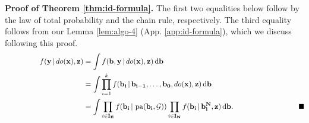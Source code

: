 \documentclass[11pt]{article}
\DeclareMathOperator{\pa}{pa}
\newcommand{\BlackBox}{\rule{1.5ex}{1.5ex}}  %
\newcommand{\mb}[1]{\mathbf{#1}}
\newcommand{\g}[1][G]{\mathcal{#1}}
\newcommand*\diff{\mathop{}\!\mathrm{d}}
\newenvironment{proofofnoqed}[1][]{\noindent \textbf{Proof of #1.}}{}
\begin{document}
\begin{proofofnoqed}[Theorem \ref{thm:id-formula}]
    The first two equalities below follow by the law of total probability and the chain rule, respectively. The third equality follows from our Lemma \ref{lem:algo-4} (App. \ref{app:id-formula}), which we discuss following this proof.
    \begingroup
    \allowdisplaybreaks
    \begin{align*}
        \hspace{.65in}
        f(\mb{y} \,|\, do(\mb{x}), \mb{z})
            &= \int f(\mb{b}, \mb{y} \,|\, do(\mb{x}), \mb{z}) \diff \mb{b}&\\
            &= \int \prod_{i=1}^{k} f(\mb{b_i} \,|\, \mb{b_{i-1}}, \dots, \mb{b_0}, do(\mb{x}), \mb{z}) \diff \mb{b} &\\
            &= \int \prod_{i\in \mb{I_E}} f(\mb{b_i} \,|\, \pa(\mb{b_i},\g)) \prod_{i \in \mb{I_N}} f(\mb{b_i} \,|\, \mb{b_i^N}, \mb{z}) \diff \mb{b}. &\hspace{1.10in} \BlackBox
    \end{align*}
    \endgroup
\end{proofofnoqed}
\end{document}
